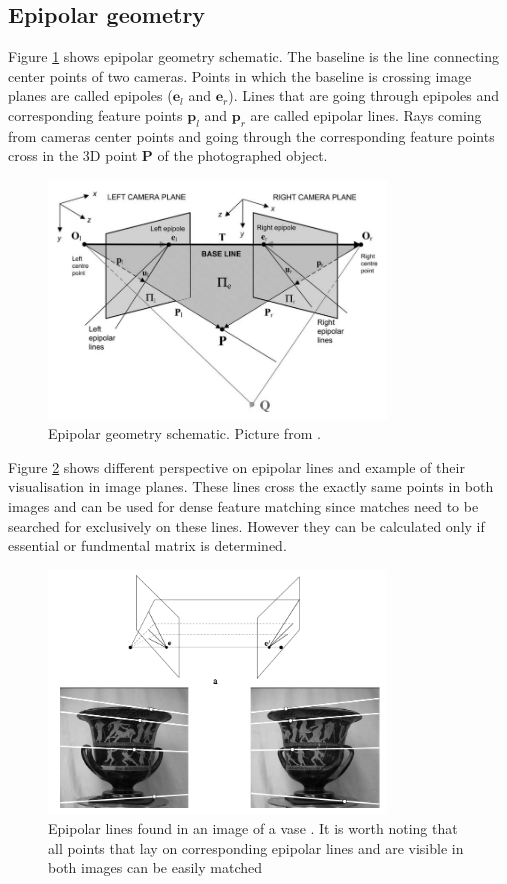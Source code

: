\subsection{Epipolar geometry}
Figure \ref{fig:epipolar_geometry} shows epipolar geometry schematic. The baseline is the line connecting center points of two cameras. Points in which the baseline is crossing image planes are called epipoles ($\textbf{e}_l$ and $\textbf{e}_r$). Lines that are going through epipoles and corresponding feature points $\textbf{p}_l$ and $\textbf{p}_r$ are called epipolar lines. Rays coming from cameras center points and going through the corresponding feature points cross in the 3D point \textbf{P} of the photographed object.
\begin{figure}[!h]
    \centering
    \includegraphics[width=0.8\textwidth]{epipolar_geometry}
    \caption{Epipolar geometry schematic. Picture from \cite{Cyganek3dVision}. }
    \label{fig:epipolar_geometry}
\end{figure}
Figure \ref{fig:EpipolarGeometry} shows different perspective on epipolar lines and example of their visualisation in image planes. These lines cross the exactly same points in both images and can be used for dense feature matching since matches need to be searched for exclusively on these lines. However they can be calculated only if essential or fundmental matrix is determined.
\begin{figure}[!h]
    \centering
    \includegraphics[width=0.8\textwidth]{EpipolarGeometry}
    \caption[Epipolar lines found in an image of a vase]{Epipolar lines found in an image of a vase \cite{HartleyMultipleView}. It is worth noting that all points that lay on corresponding epipolar lines and are visible in both images can be easily matched}
    \label{fig:EpipolarGeometry}
\end{figure} \\
